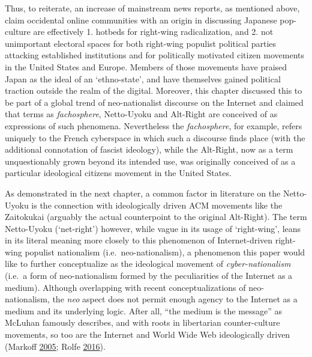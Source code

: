 \documentclass[10pt,british,A4paper,oneside]{memoir}
\begin{document}
Thus, to reiterate, an increase of mainstream news reports, as mentioned
above, claim occidental online communities with an origin in discussing
Japanese pop-culture are effectively 1. hotbeds for right-wing
radicalization, and 2. not unimportant electoral spaces for both
right-wing populist political parties attacking established institutions
and for politically motivated citizen movements in the United States and
Europe. Members of those movements have praised Japan as the ideal of an
`ethno-state', and have themselves gained political traction outside the
realm of the digital. Moreover, this chapter discussed this to be part
of a global trend of neo-nationalist discourse on the Internet and
claimed that terms as \emph{fachosphere}, Netto-Uyoku and Alt-Right are
conceived of as expressions of such phenomena. Nevertheless the
\emph{fachosphere}, for example, refers uniquely to the French
cyberspace in which such a discourse finds place (with the additional
connotation of fascist ideology), while the Alt-Right, now as a term
unquestionably grown beyond its intended use, was originally conceived
of as a particular ideological citizens movement in the United States.

As demonstrated in the next chapter, a common factor in literature on
the Netto-Uyoku is the connection with ideologically driven ACM
movements like the Zaitokukai (arguably the actual counterpoint to the
original Alt-Right). The term Netto-Uyoku (`net-right') however, while
vague in its usage of `right-wing', leans in its literal meaning more
closely to this phenomenon of Internet-driven right-wing populist
nationalism (i.e.~neo-nationalism), a phenomenon this paper would like
to further conceptualize as the ideological movement of
\emph{cyber-nationalism} (i.e.~a form of neo-nationalism formed by the
peculiarities of the Internet as a medium). Although overlapping with
recent conceptualizations of neo-nationalism, the \emph{neo} aspect does
not permit enough agency to the Internet as a medium and its underlying
logic. After all, ``the medium is the message'' as McLuhan famously
describes, and with roots in libertarian counter-culture movements, so
too are the Internet and World Wide Web ideologically driven (Markoff
\protect\hyperlink{ref-markoff_what_2005}{2005}; Rolfe
\protect\hyperlink{ref-rolfe_reinvention_2016}{2016}).
\end{document}
